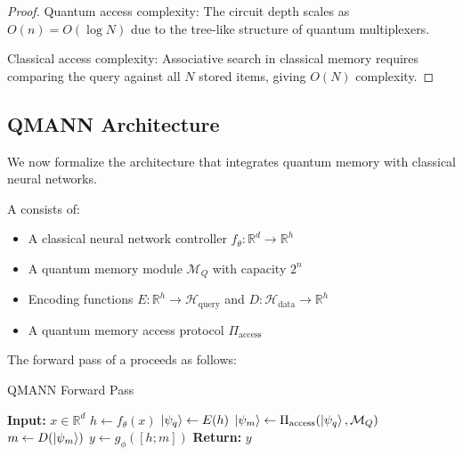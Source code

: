 \begin{proof}
Quantum access complexity: The \qram circuit depth scales as $O(n) = O(\log N)$ due to the tree-like structure of quantum multiplexers.

Classical access complexity: Associative search in classical memory requires comparing the query against all $N$ stored items, giving $O(N)$ complexity.
\end{proof}

\subsection{QMANN Architecture}

We now formalize the \qmann architecture that integrates quantum memory with classical neural networks.

\begin{definition}
\label{def:qmann}
A \qmann consists of:
\begin{itemize}
    \item A classical neural network controller $f_{\theta}: \mathbb{R}^d \rightarrow \mathbb{R}^h$
    \item A quantum memory module $\mathcal{M}_Q$ with capacity $2^n$
    \item Encoding functions $E: \mathbb{R}^h \rightarrow \mathcal{H}_{\text{query}}$ and $D: \mathcal{H}_{\text{data}} \rightarrow \mathbb{R}^h$
    \item A quantum memory access protocol $\Pi_{\text{access}}$
\end{itemize}
\end{definition}

The forward pass of a \qmann proceeds as follows:

\begin{algorithm}
\caption{QMANN Forward Pass}
\label{alg:qmann_forward}
\begin{algorithmic}
\STATE \textbf{Input:} $x \in \mathbb{R}^d$
\STATE $h \leftarrow f_{\theta}(x)$ 
\STATE $\left|\psi_q\right\rangle \leftarrow E(h)$ 
\STATE $\left|\psi_m\right\rangle \leftarrow \Pi_{\text{access}}(\left|\psi_q\right\rangle, \mathcal{M}_Q)$ 
\STATE $m \leftarrow D(\left|\psi_m\right\rangle)$ 
\STATE $y \leftarrow g_{\phi}([h; m])$ 
\STATE \textbf{Return:} $y$
\end{algorithmic}
\end{algorithm}

